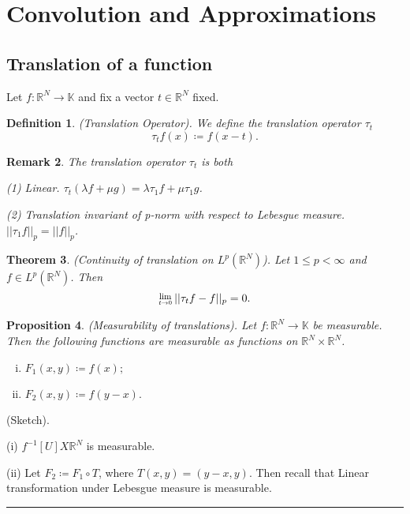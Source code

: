 \documentclass[twoside]{article}
\newcounter{lecnum}
\newcommand{\Lim}[1]{\raisebox{0.5ex}{\scalebox{0.8}{$\displaystyle \lim_{#1}\;$}}}
\newtheorem{theorem}{Theorem}[lecnum]
\newtheorem{proposition}[theorem]{Proposition}
\newtheorem{remark}[theorem]{Remark}
\newtheorem{definition}[theorem]{Definition}
\newenvironment{proof}{{\bf Proof:}}{\hfill\rule{2mm}{2mm}}
\begin{document}
\section{Convolution and Approximations}
\subsection{Translation of a function}

Let $f: \mathbb{R}^N \rightarrow \mathbb{K}$ and fix a vector $t \in \mathbb{R}^N$ fixed.

\begin{definition}(Translation Operator). We define the translation operator $\tau_t$
$$
\tau_tf(x) \coloneqq f(x - t).
$$
\end{definition}

\begin{remark}The translation operator $\tau_t$ is both

(1) Linear. $\tau_t(\lambda f + \mu g) = \lambda \tau_1 f + \mu \tau_1 g$.

(2) Translation invariant of p-norm with respect to Lebesgue measure. $||\tau_1f||_p = ||f||_p$.
\end{remark}

\begin{theorem}(Continuity of translation on $L^p(\mathbb{R}^N)$). Let $1 \leq p < \infty$ and $f \in L^p(\mathbb{R}^N)$. Then
$$
\Lim{t \rightarrow 0}||\tau_tf - f||_p = 0.
$$
\end{theorem}

\begin{proposition}(Measurability of translations). Let $f: \mathbb{R}^N \rightarrow \mathbb{K}$ be measurable. Then the following functions are measurable as functions on $\mathbb{R}^N \times \mathbb{R}^N$.

\begin{enumerate}[(i)]
  \item $F_1(x,y) \coloneqq f(x);$
  \item $F_2(x,y) \coloneqq f(y-x).$
\end{enumerate}
\end{proposition}

\begin{proof}(Sketch).

(i) $f^{-1}[U] X \mathbb{R}^N$ is measurable.

(ii) Let $F_2 \coloneqq F_1 \circ T$, where $T(x,y) = (y-x,y)$. Then recall that Linear transformation under Lebesgue measure is measurable.
\end{proof}
\end{document}
